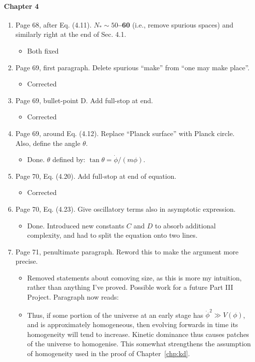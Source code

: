 \documentclass[11pt]{article}
\begin{document}
\paragraph{Chapter 4}
\begin{enumerate}
\item Page 68, after Eq. (4.11). $N_\ast \sim 50$\textbf{--60} (i.e.,
  remove spurious spaces) and similarly right at the end of Sec. 4.1.
  \begin{itemize}
    \item Both fixed
  \end{itemize}
\item Page 69, first paragraph. Delete spurious ``make'' from ``one
  may make place''.
  \begin{itemize}
    \item Corrected
  \end{itemize}
\item Page 69, bullet-point D. Add full-stop at end.
  \begin{itemize}
    \item Corrected
  \end{itemize}
\item Page 69, around Eq. (4.12). Replace ``Planck surface'' with
  Planck circle. Also, define the angle $\theta$.
  \begin{itemize}
      \item Done. $\theta$ defined by: \(\tan\theta  = \dot{\phi}/(m\phi)\).
  \end{itemize}
\item Page 70, Eq. (4.20). Add full-stop at end of equation.
  \begin{itemize}
    \item Corrected
  \end{itemize}
\item Page 70, Eq. (4.23). Give oscillatory terms also in asymptotic
  expression.
  \begin{itemize}
    \item Done. Introduced new constants $C$ and $D$ to absorb additional complexity, and had to split the equation onto two lines.
  \end{itemize}
\item Page 71, penultimate paragraph. Reword this to make the argument
  more precise.
  \begin{itemize}
      \item Removed statements about comoving size, as this is more my intuition, rather than anything I've proved. Possible work for a future Part III Project. Paragraph now reads:
      \item Thus, if some portion of the universe at an early stage has \(\dot{\phi}^2 \gg V(\phi)\), and is approximately homogeneous, then evolving forwards in time its homogeneity will tend to increase. Kinetic dominance thus causes patches of the universe to homogenise. This somewhat strengthens the assumption of homogeneity used in the proof of Chapter~\ref{chp:kd}.
  \end{itemize}
\end{enumerate}
\end{document}
